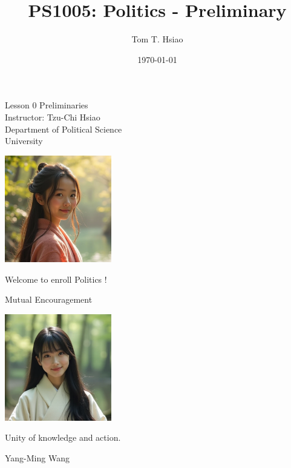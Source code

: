 \documentclass{beamer}
\title{PS1005: Politics - Preliminary}
\author{Tom T. Hsiao}
\date{\today}
\begin{document}
\begin{frame}
\begin{center}
\Large{Lesson 0 Preliminaries} \\
\vspace{3em}
\normalsize{Instructor: Tzu-Chi Hsiao} \\
\vspace{3em}
\small{Department of Political Science} \\
\vspace{1em}
\small{University} \\
\end{center}
\end{frame}
\begin{frame}{}
\begin{center}
\includegraphics[width=0.35\textwidth]{instructor.png}
\end{center}
\vspace{1em}
\begin{center}
\large{Welcome to enroll Politics !} \\
\end{center}
\end{frame}
\begin{frame}{Mutual Encouragement}
\begin{center}
\includegraphics[width=0.35\textwidth]{mc.png}
\end{center}
\begin{center}
Unity of knowledge and action.
\end{center}
\flushright Yang-Ming Wang
\end{frame}
\end{document}
